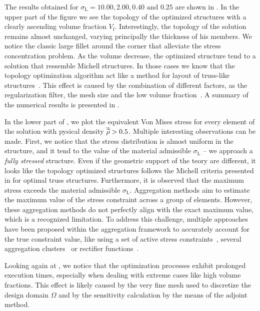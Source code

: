 The results obtained for $\sigma_\text{L}=10.00,2.00,0.40\text{ and }0.25$ are shown in . In the upper part of the figure we see the topology of the optimized structures with a clearly ascending volume fraction $V_\text{f}$. Interestingly, the topology of the solution remains almost unchanged, varying principally the thickness of his members. We notice the classic large fillet around the corner that alleviate the stress concentration problem. As the volume decrease, the optimized structure tend to a solution that ressemble Michell structures. In those cases we know that the topology optimization algorithm act like a method for layout of truss-like structures~. This effect is caused by the combination of different factors, as the regularization filter, the mesh size and the low volume fraction~. A summary of the numerical results is presented in .

In the lower part of , we plot the equivalent Von Mises stress for every element of the solution with pysical density $\overline{\widetilde{\rho}}>0.5$. Multiple interesting observations can be made. First, we notice that the stress distribution is almost uniform in the structure, and it tend to the value of the material admissible $\sigma_\text{L}$ -- \ie we approach a \textit{fully stressed} structure. Even if the geometric support of the teory are different, it looks like the topology optimized structures follows the Michell criteria presented in  for optimal truss structures. Furthermore, it is observed that the maximum stress exceeds the material admissible $\sigma_\text{L}$. Aggregation methods aim to estimate the maximum value of the stress constraint across a group of elements. However, these aggregation methods do not perfectly align with the exact maximum value, which is a recognized limitation. To address this challenge, multiple approaches have been proposed within the aggregation framework to accurately account for the true constraint value, like using a set of active stress constraints~, several aggregation clusters~ or rectifier functions~.

Looking again at , we notice that the optimization processes exhibit prolonged execution times, especially when dealing with extreme cases like high volume fractions. This effect is likely caused by the very fine mesh used to discretize the design domain $\Omega$ and by the sensitivity calculation by the means of the adjoint method.

